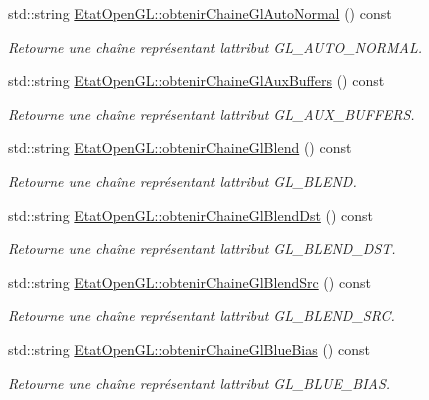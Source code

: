 \begin{DoxyCompactItemize}
std\+::string \hyperlink{group__utilitaire_gaaf8d3f8a4dd51812950c32268c8f77c5}{Etat\+Open\+G\+L\+::obtenir\+Chaine\+Gl\+Auto\+Normal} () const 
\begin{DoxyCompactList}\small\item\em Retourne une chaîne représentant l\textquotesingle{}attribut G\+L\+\_\+\+A\+U\+T\+O\+\_\+\+N\+O\+R\+M\+A\+L. \end{DoxyCompactList}\item 
std\+::string \hyperlink{group__utilitaire_gab8c780e176faece6cbaa11084e957e8d}{Etat\+Open\+G\+L\+::obtenir\+Chaine\+Gl\+Aux\+Buffers} () const 
\begin{DoxyCompactList}\small\item\em Retourne une chaîne représentant l\textquotesingle{}attribut G\+L\+\_\+\+A\+U\+X\+\_\+\+B\+U\+F\+F\+E\+R\+S. \end{DoxyCompactList}\item 
std\+::string \hyperlink{group__utilitaire_ga8a5f949f2b7a9a911c0677d639bebae5}{Etat\+Open\+G\+L\+::obtenir\+Chaine\+Gl\+Blend} () const 
\begin{DoxyCompactList}\small\item\em Retourne une chaîne représentant l\textquotesingle{}attribut G\+L\+\_\+\+B\+L\+E\+N\+D. \end{DoxyCompactList}\item 
std\+::string \hyperlink{group__utilitaire_gaa52ab39bcb62d4f8777afddfca458650}{Etat\+Open\+G\+L\+::obtenir\+Chaine\+Gl\+Blend\+Dst} () const 
\begin{DoxyCompactList}\small\item\em Retourne une chaîne représentant l\textquotesingle{}attribut G\+L\+\_\+\+B\+L\+E\+N\+D\+\_\+\+D\+S\+T. \end{DoxyCompactList}\item 
std\+::string \hyperlink{group__utilitaire_ga510a36fe5d3e313756e40b5c67b516ba}{Etat\+Open\+G\+L\+::obtenir\+Chaine\+Gl\+Blend\+Src} () const 
\begin{DoxyCompactList}\small\item\em Retourne une chaîne représentant l\textquotesingle{}attribut G\+L\+\_\+\+B\+L\+E\+N\+D\+\_\+\+S\+R\+C. \end{DoxyCompactList}\item 
std\+::string \hyperlink{group__utilitaire_ga95f9a6baabd65a0cdd4b1e5cbeb4f678}{Etat\+Open\+G\+L\+::obtenir\+Chaine\+Gl\+Blue\+Bias} () const 
\begin{DoxyCompactList}\small\item\em Retourne une chaîne représentant l\textquotesingle{}attribut G\+L\+\_\+\+B\+L\+U\+E\+\_\+\+B\+I\+A\+S. \end{DoxyCompactList}\item 

\end{DoxyCompactItemize}
